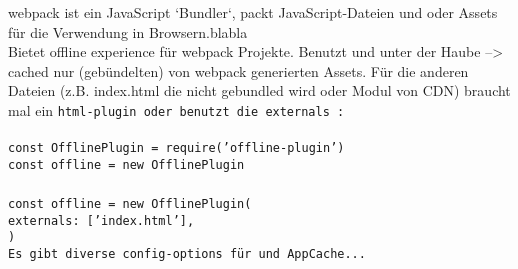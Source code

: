 webpack ist ein JavaScript `Bundler`, packt JavaScript-Dateien und oder \gls{Assets} für die Verwendung in Browsern.blabla\\
Bietet offline experience für webpack Projekte. Benutzt  und  unter der Haube --> cached nur (gebündelten) von webpack generierten \gls{Assets}. Für die anderen Dateien (z.B. index.html die nicht gebundled wird oder Modul von CDN) braucht mal ein \tt{html-plugin} oder benutzt die \tt{externals} :\\\\
\tt{const OfflinePlugin = require('offline-plugin')\\
  const offline = new OfflinePlugin\\\\
  const offline = new OfflinePlugin({\\
    externals: ['index.html'],\\
    })}\\
Es gibt diverse config-options für  und AppCache...~\cite{webpack-gh}
